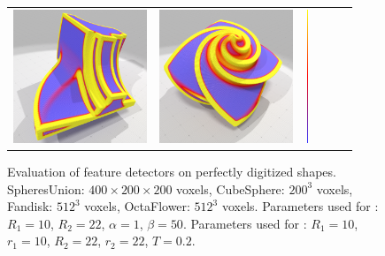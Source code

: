 \begin{figure}[ht]
\begin{center}
\begin{tabular}{l c c c cl}
      \includegraphics[width=4.0cm]{images/Feature/Fandisk_VCM_r_22} &
      \includegraphics[width=4.0cm]{images/Feature/OctaFlower_512_VCM_r_22} &
      \includegraphics[width=0.1cm,height=4cm]{images/YMTB6W}
    \end{tabular}
    \caption[Evaluation of feature detectors on perfectly digitized shapes.]{Evaluation of feature detectors on perfectly digitized shapes.
    SpheresUnion: $400 \times 200 \times 200$ voxels, CubeSphere: $200^3$ voxels, Fandisk: $512^3$ voxels, OctaFlower: $512^3$ voxels.
    Parameters used for \cite{Telea2004}: $R_1 = 10$, $R_2 = 22$, $\alpha = 1$, $\beta = 50$.
    Parameters used for \cite{Merigot2011}: $R_1 = 10$, $r_1 = 10$, $R_2 = 22$, $r_2 = 22$, $T = 0.2$.\label{fig:feature-comparative}}
  \end{center}
\end{figure}
%
